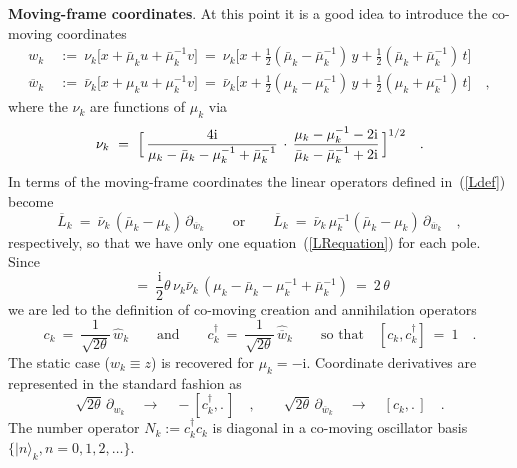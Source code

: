 \documentclass[a4paper,11pt]{article}
\numberwithin{equation}{section}
\def\i{\mbox{i}}
\def\pa{\mbox{$\partial$}}
\def\sfrac#1#2{{\textstyle\frac{#1}{#2}}}
\newcommand{\cdag}{c^{\dagger}}
\newcommand{\wb}{\overline{w}}
\begin{document}
\noindent
{\bf Moving-frame coordinates}.
At this point it is a good idea to introduce the co-moving coordinates
\begin{align}
w_k\ &:=\ \nu_k\bigl[x+\bar{\mu}_k u +\bar{\mu}_k^{-1} v\bigr]\ =\
\nu_k\bigl[x + \sfrac{1}{2}(\bar{\mu}_k-\bar{\mu}_k^{-1})\,y +
\sfrac{1}{2}(\bar{\mu}_k+\bar{\mu}_k^{-1})\,t\bigr]
\nonumber \\[4pt] \label{wdef}
\wb_k\ &:=\ \bar\nu_k\bigl[x+\mu_k u +\mu_k^{-1} v\bigr]\ =\
\bar\nu_k\bigl[x + \sfrac{1}{2}(\mu_k-\mu_k^{-1})\,y +
\sfrac{1}{2}(\mu_k+\mu_k^{-1})\,t\bigr] \quad,
\end{align}
where the $\nu_k$ are functions of $\mu_k$ via
\begin{equation} \label{nudef}
\nu_k\ =\ \Bigl[\,\frac{4\i}{\mu_k-\bar\mu_k-\mu_k^{-1}+\bar\mu_k^{-1}}\,
\cdot\,\frac{\mu_k-\mu_k^{-1}-2\i}{\bar\mu_k-\bar\mu_k^{-1}+2\i}\,\Bigr]^{1/2}
\quad.
\end{equation}
In terms of the moving-frame coordinates the linear operators defined
in~(\ref{Ldef}) become
\begin{equation}
\overline{L}_k\ =\ \bar\nu_k\,(\bar{\mu}_k-\mu_k)\,\pa_{\wb_k}
\qquad\textrm{or}\qquad
\overline{L}_k\ =\ \bar\nu_k\,\mu_k^{-1} (\bar{\mu}_k-\mu_k)\,\pa_{\wb_k} \quad,
\end{equation}
respectively, so that we have only one equation~(\ref{LRequation})
for each pole. Since
\begin{equation}
[\hat{w}_k,\hat{\wb}_k]\ =\ \sfrac{\i}{2}\theta\,
\nu_k\bar\nu_k\,(\mu_k-\bar{\mu}_k-\mu_k^{-1}+\bar{\mu}_k^{-1})
\ =\ 2\,\theta
\end{equation}
we are led to the definition of co-moving creation and annihilation operators
\begin{equation}
c_k\ =\ \frac{1}{\sqrt{2\theta}}\,\hat{w}_k
\qquad\textrm{and}\qquad
\cdag_k\ =\ \frac{1}{\sqrt{2\theta}}\,\hat{\wb}_k
\qquad \textrm{so that}\quad
[c_k,\cdag_k]\ =\ 1 \quad.
\end{equation}
The static case ($w_k{\equiv}z$) is recovered for $\mu_k=-\i$.
Coordinate derivatives are represented in the standard fashion as
\cite{alv,gross3}
\begin{equation}\label{ccreat2}
\sqrt{2\theta}\,\pa_{w_k}
\quad\longrightarrow\quad -[\cdag_k, .\,] \quad, \qquad
\sqrt{2\theta}\,\pa_{\wb_k}
\quad\longrightarrow\quad [c_k, .\,] \quad.
\end{equation}
The number operator $N_k:=\cdag_k c_k$ is diagonal
in a co-moving oscillator basis $\bigl\{|n\rangle_k, n{=}0,1,2,\ldots\bigr\}$.
\end{document}
